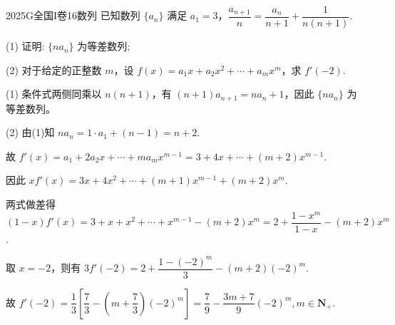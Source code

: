 
\begin{problem}{2025}{G}{全国I卷}{16}{数列}
已知数列 $\{a_n\}$ 满足 $a_1=3$，$\dfrac{a_{n+1}}{n} = \dfrac{a_n}{n+1} + \dfrac{1}{n(n+1)}$.

(1) 证明: $\{n a_n\}$ 为等差数列;

(2) 对于给定的正整数 $m$，设 $f(x)=a_1x + a_2x^2 + \cdots + a_m x^m$，求 $f'(-2)$.
\end{problem}

\begin{solutions}
(1) 条件式两侧同乘以 $n(n+1)$，有 $(n+1)a_{n+1}=n a_n+1$，因此 $\{n a_n\}$ 为等差数列。

(2) 由(1)知 $n a_n=1\cdot a_1+(n-1)=n+2$.

故 $f'(x)=a_1+2a_2 x+\cdots+m a_m x^{m-1}=3+4x+\cdots+(m+2)x^{m-1}$.

因此 $x f'(x)=3x+4x^2+\cdots+(m+1)x^{m-1}+(m+2)x^m$.

两式做差得 $(1-x)f'(x)=3+x+x^2+\cdots+x^{m-1}-(m+2)x^m = 2+\dfrac{1-x^m}{1-x}-(m+2)x^m$.

取 $x=-2$，则有 $3f'(-2)=2+\dfrac{1-(-2)^m}{3}-(m+2)(-2)^m$.

故 $f'(-2)=\dfrac{1}{3}\left[\dfrac{7}{3}-\left(m+\dfrac{7}{3}\right)(-2)^m\right]=\dfrac{7}{9}-\dfrac{3m+7}{9}(-2)^m, m \in \mathbf{N}_+$.
\end{solutions}
